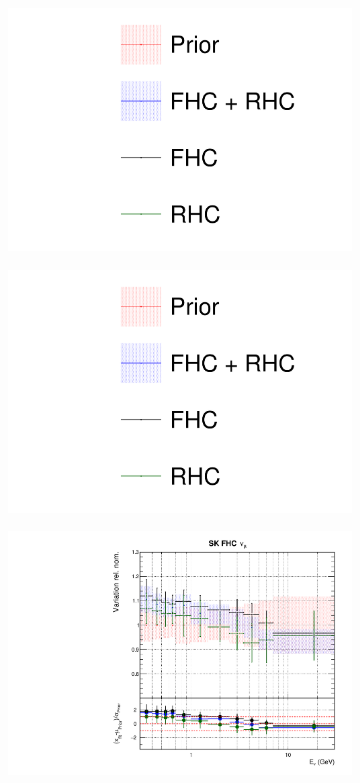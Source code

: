 \begin{figure}
\centering
\begin{subfigure}{0.3\textwidth}
  \centering
  \includegraphics[width=1.0\linewidth, trim={5mm  90mm 0mm 0mm}, clip]{figs/fhcrhcfits_leg}
\end{subfigure}
\begin{subfigure}{0.3\textwidth}
  \centering
  \includegraphics[width=1.0\linewidth, trim={5mm  0mm 0mm 95mm}, clip]{figs/fhcrhcfits_leg}
\end{subfigure}
\begin{subfigure}{0.45\textwidth}
  \centering
  \includegraphics[width=0.75\linewidth]{figs/fhcrhcfitsflux_8}

\end{subfigure}
\end{figure}
